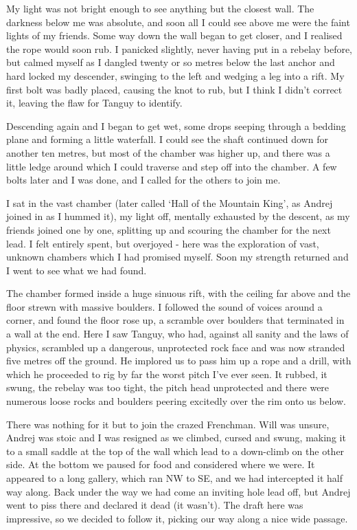 My light was not bright enough to see anything but the closest wall. The darkness below me was absolute, and soon all I could see above me were the faint lights of my friends. Some way down the wall began to get closer, and I realised the rope would soon rub. I panicked slightly, never having put in a rebelay before, but calmed myself as I dangled twenty or so metres below the last anchor and hard locked my descender, swinging to the left and wedging a leg into a rift. My first bolt was badly placed, causing the knot to rub, but I think I didn’t correct it, leaving the flaw for Tanguy to identify. 
 
Descending again and I began to get wet, some drops seeping through a bedding plane and forming a little waterfall. I could see the shaft continued down for another ten metres, but most of the chamber was higher up, and there was a little ledge around which I could traverse and step off into the chamber. A few bolts later and I was done, and I called for the others to join me.
 
I sat in the vast chamber (later called ‘Hall of the Mountain King’, as Andrej joined in as I hummed it), my light off, mentally exhausted by the descent, as my friends joined one by one, splitting up and scouring the chamber for the next lead. I felt entirely spent, but overjoyed - here was the exploration of vast, unknown chambers which I had promised myself. Soon my strength returned and I went to see what we had found.
 
The chamber formed inside a huge sinuous rift, with the ceiling far above and the floor strewn with massive boulders. I followed the sound of voices around a corner, and found the floor rose up, a scramble over boulders that terminated in a wall at the end. Here I saw Tanguy, who had, against all sanity and the laws of physics, scrambled up a dangerous, unprotected rock face and was now stranded five metres off the ground. He implored us to pass him up a rope and a drill, with which he proceeded to rig by far the worst pitch I’ve ever seen. It rubbed, it swung, the rebelay was too tight, the pitch head unprotected and there were numerous loose rocks and boulders peering excitedly over the rim onto us below.


 
There was nothing for it but to join the crazed Frenchman. Will was unsure, Andrej was stoic and I was resigned as we climbed, cursed and swung, making it to a small saddle at the top of the wall which lead to a down-climb on the other side. At the bottom we paused for food and considered where we were. It appeared to a long gallery, which ran NW to SE, and we had intercepted it half way along. Back under the way we had come an inviting hole lead off, but Andrej went to piss there and declared it dead (it wasn’t). The draft here was impressive, so we decided to follow it, picking our way along a nice wide passage.
 
